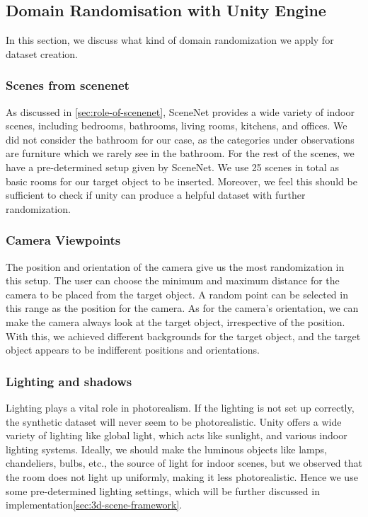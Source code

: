\subsection{Domain Randomisation with Unity Engine}\label{subsec:domain-randomisation-with-unity-engine}
In this section, we discuss what kind of domain randomization we apply for dataset creation.
\subsubsection{Scenes from scenenet}\label{subsubsec:scenes-from-scenenet}
As discussed in \autoref{sec:role-of-scenenet}, SceneNet provides a wide variety of indoor scenes, including bedrooms, bathrooms, living rooms, kitchens, and offices.
We did not consider the bathroom for our case, as the categories under observations are furniture which we rarely see in the bathroom.
For the rest of the scenes, we have a pre-determined setup given by SceneNet.
We use 25 scenes in total as basic rooms for our target object to be inserted.
Moreover, we feel this should be sufficient to check if unity can produce a helpful dataset with further randomization.

\subsubsection{Camera Viewpoints}
The position and orientation of the camera give us the most randomization in this setup.
The user can choose the minimum and maximum distance for the camera to be placed from the target object.
A random point can be selected in this range as the position for the camera.
As for the camera's orientation, we can make the camera always look at the target object, irrespective of the position.
With this, we achieved different backgrounds for the target object, and the target object appears to be indifferent positions and orientations.

\subsubsection{Lighting and shadows}
Lighting plays a vital role in photorealism.
If the lighting is not set up correctly, the synthetic dataset will never seem to be photorealistic.
Unity offers a wide variety of lighting like global light, which acts like sunlight, and various indoor lighting systems.
Ideally, we should make the luminous objects like lamps, chandeliers, bulbs, etc.,
the source of light for indoor scenes, but we observed that the room does not light up uniformly,
making it less photorealistic.
Hence we use some pre-determined lighting settings, which will be further discussed in implementation\autoref{sec:3d-scene-framework}.

